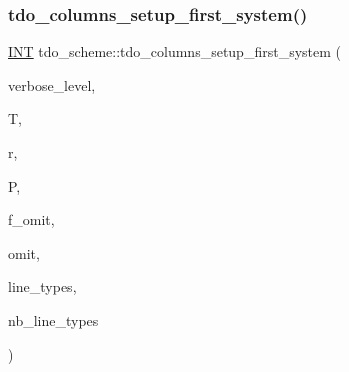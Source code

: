 \subsubsection{\texorpdfstring{tdo\+\_\+columns\+\_\+setup\+\_\+first\+\_\+system()}{tdo\_columns\_setup\_first\_system()}}
{\footnotesize\ttfamily \mbox{\hyperlink{galois_8h_a09fddde158a3a20bd2dcadb609de11dc}{I\+NT}} tdo\+\_\+scheme\+::tdo\+\_\+columns\+\_\+setup\+\_\+first\+\_\+system (\begin{DoxyParamCaption}\item[{\mbox{\hyperlink{galois_8h_a09fddde158a3a20bd2dcadb609de11dc}{I\+NT}}}]{verbose\+\_\+level,  }\item[{\mbox{\hyperlink{classtdo__data}{tdo\+\_\+data}} \&}]{T,  }\item[{\mbox{\hyperlink{galois_8h_a09fddde158a3a20bd2dcadb609de11dc}{I\+NT}}}]{r,  }\item[{\mbox{\hyperlink{classpartitionstack}{partitionstack}} \&}]{P,  }\item[{\mbox{\hyperlink{galois_8h_a09fddde158a3a20bd2dcadb609de11dc}{I\+NT}}}]{f\+\_\+omit,  }\item[{\mbox{\hyperlink{galois_8h_a09fddde158a3a20bd2dcadb609de11dc}{I\+NT}}}]{omit,  }\item[{\mbox{\hyperlink{galois_8h_a09fddde158a3a20bd2dcadb609de11dc}{I\+NT}} $\ast$\&}]{line\+\_\+types,  }\item[{\mbox{\hyperlink{galois_8h_a09fddde158a3a20bd2dcadb609de11dc}{I\+NT}} \&}]{nb\+\_\+line\+\_\+types }\end{DoxyParamCaption})}

\mbox{\label{classtdo__scheme_aaef7640a4577694958c6919ac32e6fb5}} 

